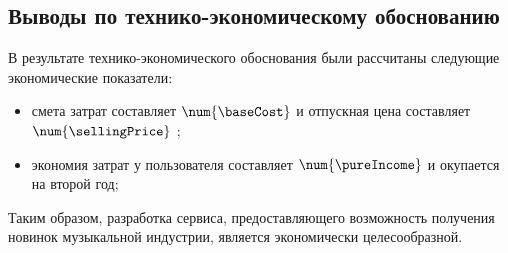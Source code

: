 \subsection{Выводы по технико-экономическому обоснованию}
В результате технико-экономического обоснования были рассчитаны следующие экономические показатели:

\begin{itemize}
  \item смета затрат составляет $ \num{\baseCost} $ \byr{} и отпускная цена составляет $ \num{\sellingPrice} $ \byr{};
  \item экономия затрат у пользователя составляет $ \num{\pureIncome} $ \byr{} и окупается на второй год;
\end{itemize}

Таким образом, разработка сервиса, предоставляющего возможность получения новинок музыкальной индустрии, является экономически целесообразной.
